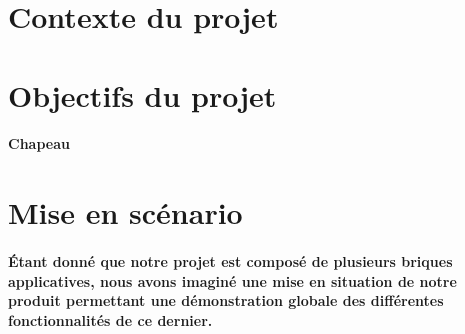 \section{Contexte du projet} \label{sec:introduction}
\begin{comment}
 Nous vivons dans une époque où les systèmes autonomes commencent à 
prendre et ont d'ores et déjà pris une place importante dans notre 
société. Par systèmes "autonomes", nous entendons des dispositifs 
informatiques capable de prendre des décisions en accord avec les 
différentes prises d'informations sur son environnement. Ainsi, notre 
projet de micro souris s'inscrit parfaitement dans ce contexte.  À une 
échelle microscopique et nanoscopique, ce projet pourrait profiter à la 
médecine dans l'exploration des différents vaisseaux du corps humain par 
exemple ; ou bien, à plus grande échelle, il pourrait servir le domaine du 
secourisme. L'intelligence mise en oeuvre sur notre dispositif embarqué se 
sert des algorithmes déjà connus et maîtrisés dans le domaine de l'intelligence 
artificielle. Bien que élaborés il y a déjà des décennies, nous voyons aujourd'hui 
apparaître de plus en plus d'implémentations de ces mêmes algorithmes dans les 
systèmes actuels grâce aux avancées concernant les composants électroniques avec 
notamment la miniaturisation de la mémoire. Ainsi, pour citer quelques systèmes 
autonomes déjà extrêmement performants qui emploient les algorithmes dont nous 
allons nous servir pour notre projet, nous pouvons évoquer la conduite autonome 
de Tesla en voie rapide (autopilot) ou bien plus généralement le domaine des jeux vidéos.

< À DEVELOPPER >
\end{comment}

\section{Objectifs du projet} \label{sec:objectifs}
\paragraph{Chapeau}

\section{Mise en scénario} \label{sec:miseEnScenario}

\paragraph{
	Étant donné que notre projet est composé de plusieurs briques applicatives, 
nous avons imaginé une mise en situation de notre produit permettant une 
démonstration globale des différentes fonctionnalités de ce dernier.}

